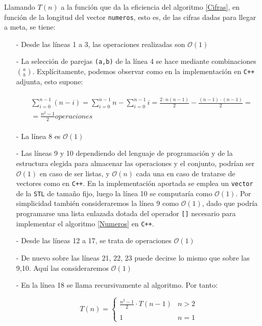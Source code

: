 \documentclass[a4paper,10pt]{scrartcl}
\def\C++#1{\texttt{#1}}
\begin{document}
   Llamando $T(n)$ a la función que da la eficiencia del algoritmo \ref{Cifras},
   en función de la longitud del vector \C++{numeros}, esto es, de las cifras
   dadas para llegar a meta, se tiene:
   \begin{itemize} 
    \item [-] Desde las líneas 1 a 3, las operaciones realizadas son $\mathcal{O}(1)$
    \item [-] La selección de parejas \C++{(a,b)} de la línea 4 se hace mediante
    combinaciones ${a \choose b}$. Explícitamente, podemos observar como en
    la implementación en \C++{C++} adjunta, esto supone:
    
    \begin{gather*}
    \begin{split}
        &\sum_{i=0}^{n-1}(n-i)=\sum_{i=0}^{n-1}n-\sum_{i=0}^{n-1}i=
        \frac{2\cdot n(n-1)}{2}-\frac{(n-1)\cdot(n-1)}{2}=\\
        &=\frac{n^2-1}{2}  operaciones 
    \end{split}
    \end{gather*}
        
    \item [-] La línea 8 es $\mathcal{O}(1)$
    \item [-] Las líneas 9 y 10 dependiendo del lenguaje de programación y de
    la estructura elegida para almacenar las operaciones y el conjunto, podrían
    ser $\mathcal{O}(1)$ en caso de ser listas, y $\mathcal{O}(n)$ cada una en
    caso de tratarse de vectores como en \C++{C++}. En la implementación
    aportada se emplea un \C++{vector} de la \C++{STL} de tamaño fijo,
    luego la línea 10 se computaría como $\mathcal{O}(1)$. Por simplicidad
    también consideraremos la línea 9 como $\mathcal{O}(1)$, dado que podría
    programarse una lista enlazada dotada del operador \C++{[]} necesario
    para implementar el algoritmo \ref{Numeros} en \C++{C++}.
    
    \item [-] Desde las líneas 12 a 17, se trata de operaciones $\mathcal{O}(1)$
    \item [-] De nuevo sobre las líneas 21, 22, 23 puede decirse lo mismo que sobre
    las 9,10. Aquí las consideraremos $\mathcal{O}(1)$
    \item [-] En la línea 18 se llama recursivamente al algoritmo. Por tanto:
    
    $$T(n)=\left\{\begin{array}{lr}
                   \frac{n^2-1}{2}\cdot T(n-1) & n>2\\
                   \ \\
                   1 & n=1
                  \end{array}\right.$$
                  

\end{itemize}
\end{document}
